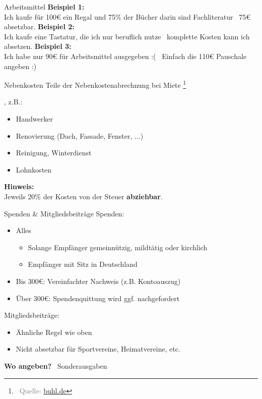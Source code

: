 \documentclass{beamer}
\let\oldfootnote\footnote
\renewcommand{\footnote}[1]
{%
	\oldfootnote
	{
		\tiny
		\textcolor{gray}{\ #1}
	}%
}
\newcommand{\citeurl}[2]
{%
	\footnote{Quelle: \href{#1}{#2}}
}
\begin{document}
			\begin{frame}{Arbeitsmittel}
				\textbf{Beispiel 1:}\\
				Ich kaufe für 100€ ein Regal und 75\% der Bücher darin sind Fachliteratur \textrightarrow\ 75€ absetzbar.\n\pause
				\textbf{Beispiel 2:}\\
				Ich kaufe eine Tastatur, die ich nur beruflich nutze \textrightarrow\ komplette Kosten kann ich absetzen.\n\pause
				\textbf{Beispiel 3:}\\
				Ich habe nur 90€ für Arbeitsmittel ausgegeben :( \textrightarrow\ Einfach die 110€ Pauschale angeben :)
			\end{frame}
		
			\begin{frame}{Nebenkosten}
				Teile der Nebenkostenabrechnung bei Miete\citeurl{https://www.buhl.de/steuer/ratgeber/nebenkosten-abrechnung-absetzen}{buhl.de}, z.B.:
				\begin{itemize}
					\item Handwerker
					\item Renovierung (Dach, Fassade, Fenster, ...)
					\item Reinigung, Winterdienst
					\item Lohnkosten
				\end{itemize}\n
				\textbf{Hinweis:}\\
				Jeweils 20\% der Kosten von der Steuer \textbf{abziehbar}.
			\end{frame}
		
			\begin{frame}{Spenden \& Mitgliedsbeiträge}
				Spenden:
				\begin{itemize}
					\item Alles
					\begin{itemize}
						\item Solange Empfänger gemeinnützig, mildtätig oder kirchlich
						\item Empfänger mit Sitz in Deutschland
					\end{itemize}
					\item Bis 300€: Vereinfachter Nachweis (z.B. Kontoauszug)
					\item Über 300€: Spendenquittung wird ggf. nachgefordert
				\end{itemize}\n\pause
				Mitgliedsbeiträge:
				\begin{itemize}
					\item Ähnliche Regel wie oben
					\item Nicht absetzbar für Sportvereine, Heimatvereine, etc.
				\end{itemize}\n\pause
				\textbf{Wo angeben?} \textrightarrow\ Sonderausgaben
			\end{frame}
		
\end{document}
